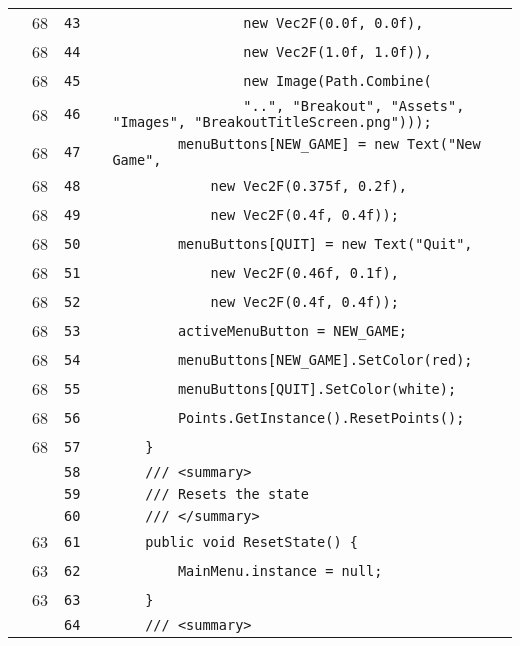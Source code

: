 \documentclass[a4paper,landscape,10pt]{article}
\begin{document}
\begin{longtable}[l]{lrrll}
\cellcolor{green} & 68 & \verb~43~ & & \verb~                new Vec2F(0.0f, 0.0f),~\\
\cellcolor{green} & 68 & \verb~44~ & & \verb~                new Vec2F(1.0f, 1.0f)),~\\
\cellcolor{green} & 68 & \verb~45~ & & \verb~                new Image(Path.Combine(~\\
\cellcolor{green} & 68 & \verb~46~ & & \verb~                "..", "Breakout", "Assets", "Images", "BreakoutTitleScreen.png")));~\\
\cellcolor{green} & 68 & \verb~47~ & & \verb~        menuButtons[NEW_GAME] = new Text("New Game",~\\
\cellcolor{green} & 68 & \verb~48~ & & \verb~            new Vec2F(0.375f, 0.2f),~\\
\cellcolor{green} & 68 & \verb~49~ & & \verb~            new Vec2F(0.4f, 0.4f));~\\
\cellcolor{green} & 68 & \verb~50~ & & \verb~        menuButtons[QUIT] = new Text("Quit",~\\
\cellcolor{green} & 68 & \verb~51~ & & \verb~            new Vec2F(0.46f, 0.1f),~\\
\cellcolor{green} & 68 & \verb~52~ & & \verb~            new Vec2F(0.4f, 0.4f));~\\
\cellcolor{green} & 68 & \verb~53~ & & \verb~        activeMenuButton = NEW_GAME;~\\
\cellcolor{green} & 68 & \verb~54~ & & \verb~        menuButtons[NEW_GAME].SetColor(red);~\\
\cellcolor{green} & 68 & \verb~55~ & & \verb~        menuButtons[QUIT].SetColor(white);~\\
\cellcolor{green} & 68 & \verb~56~ & & \verb~        Points.GetInstance().ResetPoints();~\\
\cellcolor{green} & 68 & \verb~57~ & & \verb~    }~\\
\cellcolor{gray} &  & \verb~58~ & & \verb~    /// <summary>~\\
\cellcolor{gray} &  & \verb~59~ & & \verb~    /// Resets the state~\\
\cellcolor{gray} &  & \verb~60~ & & \verb~    /// </summary>~\\
\cellcolor{green} & 63 & \verb~61~ & & \verb~    public void ResetState() {~\\
\cellcolor{green} & 63 & \verb~62~ & & \verb~        MainMenu.instance = null;~\\
\cellcolor{green} & 63 & \verb~63~ & & \verb~    }~\\
\cellcolor{gray} &  & \verb~64~ & & \verb~    /// <summary>~\\

\end{longtable}
\end{document}

